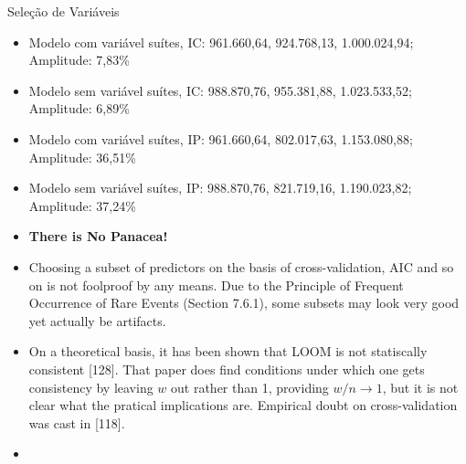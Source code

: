 \documentclass[9pt,ignorenonframetext,aspectratio=169]{beamer}
\providecommand{\tightlist}{%
  \setlength{\itemsep}{0pt}\setlength{\parskip}{0pt}}
\begin{document}
\begin{frame}{Seleção de Variáveis}
\protect\hypertarget{seleuxe7uxe3o-de-variuxe1veis-4}{}

\begin{itemize}[<+->]
\tightlist
\item
  Modelo com variável suítes, IC: 961.660,64, 924.768,13, 1.000.024,94;
  Amplitude: 7,83\%
\item
  Modelo sem variável suítes, IC: 988.870,76, 955.381,88, 1.023.533,52;
  Amplitude: 6,89\%
\item
  Modelo com variável suítes, IP: 961.660,64, 802.017,63, 1.153.080,88;
  Amplitude: 36,51\%
\item
  Modelo sem variável suítes, IP: 988.870,76, 821.719,16, 1.190.023,82;
  Amplitude: 37,24\%
\end{itemize}

\begin{itemize}[<+->]
\tightlist
\item
  \textbf{There is No Panacea!}\\
\item
  Choosing a subset of predictors on the basis of cross-validation, AIC
  and so on is not foolproof by any means. Due to the Principle of
  Frequent Occurrence of Rare Events (Section 7.6.1), some subsets may
  look very good yet actually be artifacts.\\
\item
  On a theoretical basis, it has been shown that LOOM is not statiscally
  consistent {[}128{]}. That paper does find conditions under which one
  gets consistency by leaving \(w\) out rather than 1, providing
  \(w/n \rightarrow 1\), but it is not clear what the pratical
  implications are. Empirical doubt on cross-validation was cast in
  {[}118{]}.
\item
  \autocite[348]{matloff2017}
\end{itemize}

\end{frame}
\end{document}
